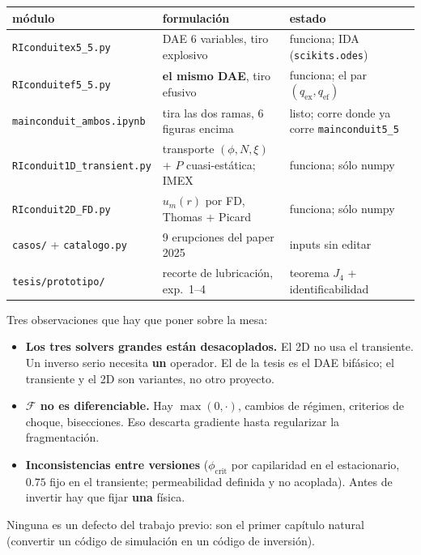 \documentclass[11pt,a4paper]{article}
\theoremstyle{plain}
\theoremstyle{definition}
\theoremstyle{remark}
\newcommand{\F}{\mathcal{F}}
\begin{document}
\begin{center}
\small
\begin{tabular}{@{}p{}p{}p{}@{}}
\toprule
módulo & formulación & estado \\
\midrule
\texttt{RIconduitex5\_5.py} &
  DAE 6 variables, tiro explosivo &
  funciona; IDA (\texttt{scikits.odes}) \\
\texttt{RIconduitef5\_5.py} &
  \textbf{el mismo DAE}, tiro efusivo &
  funciona; el par $(q_{\mathrm{ex}},q_{\mathrm{ef}})$ \\
\texttt{mainconduit\_ambos.ipynb} &
  tira las dos ramas, 6 figuras encima &
  listo; corre donde ya corre \texttt{mainconduit5\_5} \\
\texttt{RIconduit1D\_transient.py} &
  transporte $(\phi,N,\xi)$ + $P$ cuasi-estática; IMEX &
  funciona; sólo numpy \\
\texttt{RIconduit2D\_FD.py} &
  $u_m(r)$ por FD, Thomas + Picard &
  funciona; sólo numpy \\
\texttt{casos/} + \texttt{catalogo.py} &
  9 erupciones del paper 2025 &
  inputs sin editar \\
\texttt{tesis/prototipo/} &
  recorte de lubricación, exp.\ 1--4 &
  teorema $J_4$ + identificabilidad \\
\bottomrule
\end{tabular}
\end{center}

Tres observaciones que hay que poner sobre la mesa:

\begin{itemize}
\item \textbf{Los tres solvers grandes están desacoplados.}
  El 2D no usa el transiente. Un inverso serio necesita
  \textbf{un} operador. El de la tesis es el DAE bifásico; el
  transiente y el 2D son variantes, no otro proyecto.
\item \textbf{$\F$ no es diferenciable.}
  Hay $\max(0,\cdot)$, cambios de régimen, criterios de choque,
  bisecciones. Eso descarta gradiente hasta regularizar la
  fragmentación.
\item \textbf{Inconsistencias entre versiones}
  ($\phi_{\mathrm{crit}}$ por capilaridad en el estacionario,
  $0.75$ fijo en el transiente; permeabilidad definida y no
  acoplada). Antes de invertir hay que fijar \textbf{una} física.
\end{itemize}

Ninguna es un defecto del trabajo previo: son el primer capítulo
natural (convertir un código de simulación en un código de
inversión).
\end{document}
